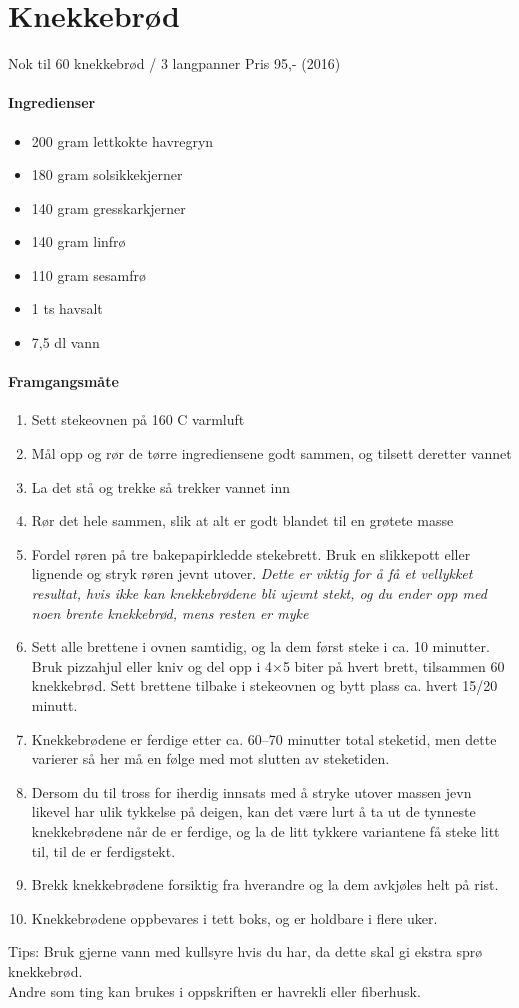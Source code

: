 \section{﻿Knekkebrød}
Nok til 60 knekkebrød / 3 langpanner
Pris 95,- (2016)

\paragraph{Ingredienser}
\begin{itemize}[noitemsep]
	\item 200 gram lettkokte havregryn
	\item 180 gram solsikkekjerner
	\item 140 gram gresskarkjerner
	\item 140 gram linfrø
	\item 110 gram sesamfrø
	\item 1 ts havsalt
	\item 7,5 dl vann
\end{itemize}

\paragraph{Framgangsmåte}
\begin{enumerate}[noitemsep]
	\item Sett stekeovnen på 160 \degree C varmluft
	\item Mål opp og rør de tørre ingrediensene godt sammen, og tilsett deretter vannet
	\item La det stå og trekke så trekker vannet inn
	\item Rør det hele sammen, slik at alt er godt blandet til en grøtete masse
	\item Fordel røren på tre bakepapirkledde stekebrett. Bruk en slikkepott eller lignende og stryk røren jevnt utover. \emph{Dette er viktig for å få et vellykket resultat, hvis ikke kan knekkebrødene bli ujevnt stekt, og du ender opp med noen brente knekkebrød, mens resten er myke}
	\item Sett alle brettene i ovnen samtidig, og la dem først steke i ca. 10 minutter. Bruk pizzahjul eller kniv og del opp i 4×5 biter på hvert brett, tilsammen 60 knekkebrød. Sett brettene tilbake i stekeovnen og bytt plass ca. hvert 15/20 minutt.
	\item Knekkebrødene er ferdige etter ca. 60--70 minutter total steketid, men dette varierer så her må en følge med mot slutten av steketiden.
	\item Dersom du til tross for iherdig innsats med å stryke utover massen jevn likevel har ulik tykkelse på deigen, kan det være lurt å ta ut de tynneste knekkebrødene når de er ferdige, og la de litt tykkere variantene få steke litt til, til de er ferdigstekt.
	\item Brekk knekkebrødene forsiktig fra hverandre og la dem avkjøles helt på rist.
	\item Knekkebrødene oppbevares i tett boks, og er holdbare i flere uker.
\end{enumerate}



Tips: Bruk gjerne vann med kullsyre hvis du har, da dette skal gi ekstra sprø knekkebrød. \\ Andre som ting kan brukes i oppskriften er havrekli eller fiberhusk.
